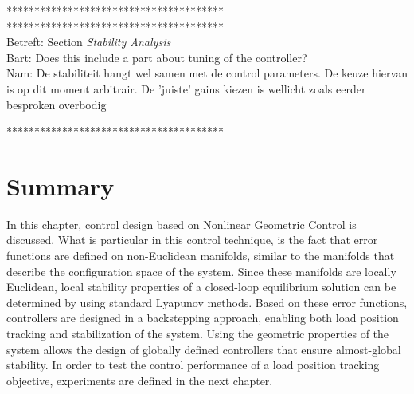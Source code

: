 ***************************************\\


***************************************\\
Betreft: Section \textit{Stability Analysis}\\
Bart: Does this include a part about tuning of the controller?\\
Nam: De stabiliteit hangt wel samen met de control parameters. De keuze hiervan is op dit moment arbitrair. De 'juiste' gains kiezen is wellicht zoals eerder besproken overbodig 

***************************************\\

\section*{Summary}
In this chapter, control design based on Nonlinear Geometric Control is discussed.
What is particular in this control technique, is the fact that error functions are defined on non-Euclidean manifolds, similar to the manifolds that describe the configuration space of the system.
Since these manifolds are locally Euclidean, local stability properties of a closed-loop equilibrium solution can be determined by using standard Lyapunov methods. 
Based on these error functions, controllers are designed in a backstepping approach, enabling both load position tracking and stabilization of the system.
Using the geometric properties of the system allows the design of globally defined controllers that ensure almost-global stability.
In order to test the control performance of a load position tracking objective, experiments are defined in the next chapter. 








